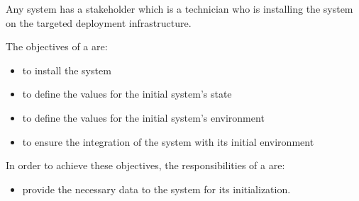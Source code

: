 Any system has a  stakeholder which is a technician who is installing the \msricrash system on the targeted deployment infrastructure.

The objectives of a  are:
\begin{itemize}
  \item to install the \msricrash system
  \item to define the values for the initial system's state
  \item to define the values for the initial system's environment
  \item to ensure the integration of the \msricrash system with its initial environment
\end{itemize}
\vspace{0.5cm}
In order to achieve these objectives, the responsibilities of a  are:
\begin{itemize}
  \item provide the necessary data to the \msricrash system for its initialization.
\end{itemize}
